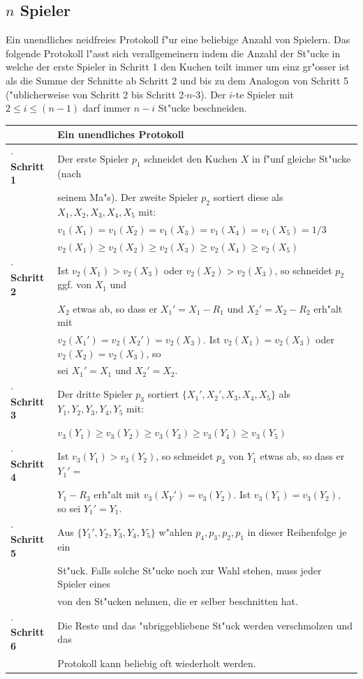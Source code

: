 \documentclass[11pt, a4paper, twoside]{article}
\numberwithin{equation}{section}
\begin{document}
\subsection{$n$ Spieler}
Ein unendliches neidfreies Protokoll f"ur eine beliebige Anzahl von Spielern.
Das folgende Protokoll l"asst sich verallgemeinern indem die Anzahl der St"ucke in welche der erste Spieler in Schritt 1 den Kuchen teilt immer um einz gr"osser ist als die Summe der Schnitte ab Schritt 2 und bis zu dem Analogon von Schritt 5 ("ublicherweise von Schritt 2 bis Schritt 2$\cdot n$-3). Der $i$-te Spieler mit $2 \leq i \leq (n-1)$ darf immer $n-i$ St"ucke beschneiden.\\
\newline
\begin{tabular}{|ll|}
\hline
&\textbf{Ein unendliches Protokoll}\\
\hline
\textbf{$\cdot$ Schritt 1}&Der erste Spieler $p_1$ schneidet den Kuchen $X$ in f"unf gleiche St"ucke (nach\\&seinem Ma"s). Der zweite Spieler $p_2$ sortiert diese als $X_1,X_2,X_3,X_4,X_5$ mit:\\
&$v_1(X_1)=v_1(X_2)=v_1(X_3)=v_1(X_4)=v_1(X_5)=1/3$\\&$v_2(X_1) \geq v_2(X_2) \geq v_2(X_3)\geq v_2(X_4)\geq v_2(X_5)$\\
\textbf{$\cdot$ Schritt 2}&Ist $v_2(X_1)>v_2(X_3)$ oder $v_2(X_2)> v_2(X_3)$, so schneidet $p_2$ ggf. von $X_1$ und\\&$X_2$ etwas ab, so dass er $X_1'=X_1-R_1$ und $X_2'=X_2-R_2$ erh"alt mit   \\&$v_2(X_1')=v_2(X_2')=v_2(X_3)$. Ist $v_2(X_1)=v_2(X_3)$ oder $v_2(X_2)=v_2(X_3)$, so\\&sei $X_1'=X_1$ und $X_2'=X_2$.\\
\textbf{$\cdot$ Schritt 3}&Der dritte Spieler $p_3$ sortiert $\{X_1',X_2',X_3,X_4,X_5\}$ als $Y_1,Y_2,Y_3,Y_4,Y_5$ mit:\\
&$v_3(Y_1) \geq v_3(Y_2) \geq v_3(Y_3)\geq v_3(Y_4)\geq v_3(Y_5)$\\
\textbf{$\cdot$ Schritt 4}&Ist $v_3(Y_1)>v_3(Y_2)$, so schneidet $p_3$ von $Y_1$ etwas ab, so dass er $Y_1'=$\\&$Y_1-R_3$ erh"alt mit $v_3(X_Y')=v_3(Y_2)$. Ist $v_3(Y_1)=v_3(Y_2)$, so sei  $Y_1'=Y_1$.\\
\textbf{$\cdot$ Schritt 5}&Aus $\{Y_1',Y_2,Y_3,Y_4,Y_5\}$ w"ahlen $p_4,p_3,p_2,p_1$ in dieser Reihenfolge je ein\\&St"uck. Falls solche St"ucke noch zur Wahl stehen, muss jeder Spieler eines\\&von den St"ucken nehmen, die er selber beschnitten hat.\\
\textbf{$\cdot$ Schritt 6}&Die Reste und das "ubriggebliebene St"uck werden verschmolzen und das\\&Protokoll kann beliebig oft wiederholt werden.\\
\hline
\end{tabular}
\end{document}
